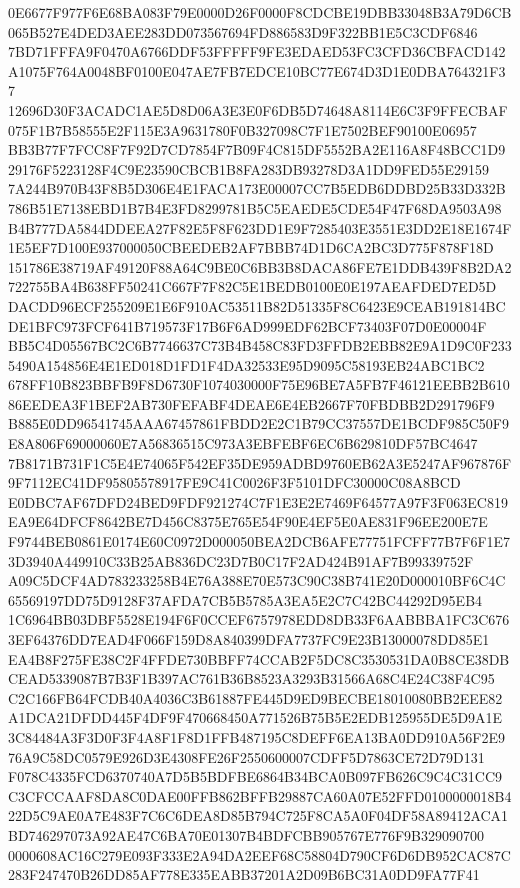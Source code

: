 \documentclass[UTF8,fontset=fandol,zihao=-4,a4paper]{ctexart}
\begin{document}
{{0E6677F977F6E68BA083F79E0000D26F0000F8CDCBE19DBB33048B3A79D6CB065B527E4DED3AEE283DD073567694FD886583D9F322BB1E5C3CDF6846
7BD71FFFA9F0470A6766DDF53FFFFF9FE3EDAED53FC3CFD36CBFACD142A1075F764A0048BF0100E047AE7FB7EDCE10BC77E674D3D1E0DBA764321F37
12696D30F3ACADC1AE5D8D06A3E3E0F6DB5D74648A8114E6C3F9FFECBAF075F1B7B58555E2F115E3A9631780F0B327098C7F1E7502BEF90100E06957
BB3B77F7FCC8F7F92D7CD7854F7B09F4C815DF5552BA2E116A8F48BCC1D929176F5223128F4C9E23590CBCB1B8FA283DB93278D3A1DD9FED55E29159
7A244B970B43F8B5D306E4E1FACA173E00007CC7B5EDB6DDBD25B33D332B786B51E7138EBD1B7B4E3FD8299781B5C5EAEDE5CDE54F47F68DA9503A98
B4B777DA5844DDEEA27F82E5F8F623DD1E9F7285403E3551E3DD2E18E1674F1E5EF7D100E937000050CBEEDEB2AF7BBB74D1D6CA2BC3D775F878F18D
151786E38719AF49120F88A64C9BE0C6BB3B8DACA86FE7E1DDB439F8B2DA2722755BA4B638FF50241C667F7F82C5E1BEDB0100E0E197AEAFDED7ED5D
DACDD96ECF255209E1E6F910AC53511B82D51335F8C6423E9CEAB191814BCDE1BFC973FCF641B719573F17B6F6AD999EDF62BCF73403F07D0E00004F
BB5C4D05567BC2C6B7746637C73B4B458C83FD3FFDB2EBB82E9A1D9C0F2335490A154856E4E1ED018D1FD1F4DA32533E95D9095C58193EB24ABC1BC2
678FF10B823BBFB9F8D6730F1074030000F75E96BE7A5FB7F46121EEBB2B61086EEDEA3F1BEF2AB730FEFABF4DEAE6E4EB2667F70FBDBB2D291796F9
B885E0DD96541745AAA67457861FBDD2E2C1B79CC37557DE1BCDF985C50F9E8A806F69000060E7A56836515C973A3EBFEBF6EC6B629810DF57BC4647
7B8171B731F1C5E4E74065F542EF35DE959ADBD9760EB62A3E5247AF967876F9F7112EC41DF95805578917FE9C41C0026F3F5101DFC30000C08A8BCD
E0DBC7AF67DFD24BED9FDF921274C7F1E3E2E7469F64577A97F3F063EC819EA9E64DFCF8642BE7D456C8375E765E54F90E4EF5E0AE831F96EE200E7E
F9744BEB0861E0174E60C0972D000050BEA2DCB6AFE77751FCFF77B7F6F1E73D3940A449910C33B25AB836DC23D7B0C17F2AD424B91AF7B99339752F
A09C5DCF4AD783233258B4E76A388E70E573C90C38B741E20D000010BF6C4C65569197DD75D9128F37AFDA7CB5B5785A3EA5E2C7C42BC44292D95EB4
1C6964BB03DBF5528E194F6F0CCEF6757978EDD8DB33F6AABBBA1FC3C6763EF64376DD7EAD4F066F159D8A840399DFA7737FC9E23B13000078DD85E1
EA4B8F275FE38C2F4FFDE730BBFF74CCAB2F5DC8C3530531DA0B8CE38DBCEAD5339087B7B3F1B397AC761B36B8523A3293B31566A68C4E24C38F4C95
C2C166FB64FCDB40A4036C3B61887FE445D9ED9BECBE18010080BB2EEE82A1DCA21DFDD445F4DF9F470668450A771526B75B5E2EDB125955DE5D9A1E
3C84484A3F3D0F3F4A8F1F8D1FFB487195C8DEFF6EA13BA0DD910A56F2E976A9C58DC0579E926D3E4308FE26F2550600007CDFF5D7863CE72D79D131
F078C4335FCD6370740A7D5B5BDFBE6864B34BCA0B097FB626C9C4C31CC9C3CFCCAAF8DA8C0DAE00FFB862BFFB29887CA60A07E52FFD0100000018B4
22D5C9AE0A7E483F7C6C6DEA8D85B794C725F8CA5A0F04DF58A89412ACA1BD746297073A92AE47C6BA70E01307B4BDFCBB905767E776F9B329090700
0000608AC16C279E093F333E2A94DA2EEF68C58804D790CF6D6DB952CAC87C283F247470B26DD85AF778E335EABB37201A2D09B6BC31A0DD9FA77F41
}}
\end{document}
